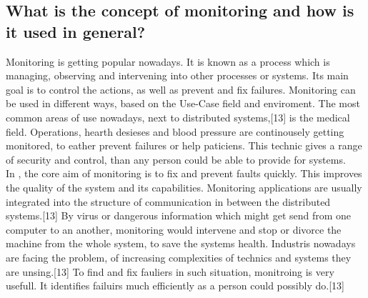 \subsection{What is the concept of monitoring and how is it used in general?}
\label{subsec:ConceptMonitoring}

Monitoring is getting popular nowadays. It is known as a process which is managing, observing and intervening into other processes or systems. Its main goal is to control the actions, as well as prevent and fix failures. Monitoring can be used in different ways, based on the Use-Case field and enviroment. The most common areas of use nowadays, next to distributed systems,[13] is the medical field. Operations, hearth desieses and blood pressure are continousely getting monitored, to eather prevent failures or help paticiens. This technic gives a range of security and control, than any person could be able to provide for systems. 
\\
 In \isds, the core aim of monitoring is to fix and prevent faults quickly. This improves the quality of the system and its capabilities. Monitoring applications are usually integrated into the structure of communication in between the distributed systems.[13] By virus or dangerous information which might get send from one computer to an another, monitoring would intervene and stop or divorce the machine from the whole system, to save the systems health. Industris nowadays are facing the problem, of increasing complexities of technics and systems they are unsing.[13] To find and fix fauliers in such situation, monitroing is very usefull. It identifies failuirs much efficiently as a person could possibly do.[13]
 
